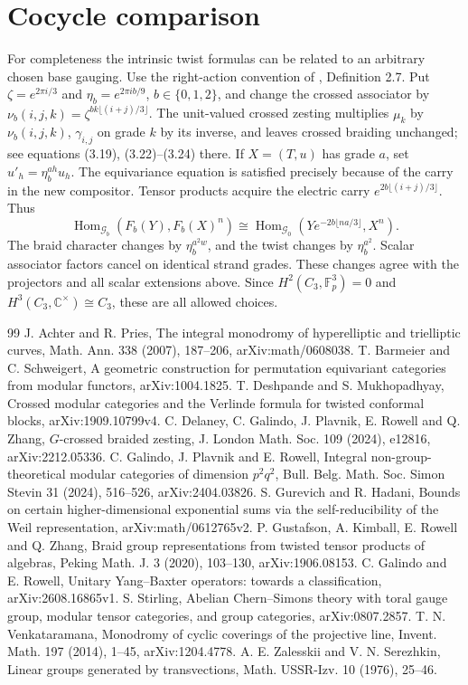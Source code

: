 \documentclass[11pt]{amsart}
\newcommand{\Fp}{\mathbb F_p}
\newcommand{\Hom}{\operatorname{Hom}}
\begin{document}
\section{Cocycle comparison}\label{zesting}
For completeness the intrinsic twist formulas can be related to an
arbitrary chosen base gauging. Use the right-action convention of
\cite{DGP RZ}, Definition 2.7. Put $\zeta=e^{2\pi i/3}$ and
$\eta_b=e^{2\pi i b/9}$, $b\in\{0,1,2\}$, and change the crossed
associator by
$\nu_b(i,j,k)=\zeta^{bk\lfloor(i+j)/3\rfloor}$.
The unit-valued crossed zesting multiplies $\mu_k$ by $\nu_b(i,j,k)$,
$\gamma_{i,j}$ on grade $k$ by its inverse, and leaves crossed
braiding unchanged; see equations (3.19), (3.22)--(3.24) there.
If $X=(T,u)$ has grade $a$, set $u'_h=\eta_b^{ah}u_h$.
The equivariance equation is satisfied precisely because of the
carry in the new compositor. Tensor products acquire the electric
carry $e^{2b\lfloor(i+j)/3\rfloor}$. Thus
\[
\Hom_{\mathcal G_b}(F_b(Y),F_b(X)^n)
\cong\Hom_{\mathcal G_0}
(Y e^{-2b\lfloor na/3\rfloor},X^n).
\]
The braid character changes by $\eta_b^{a^2w}$, and the twist changes
by $\eta_b^{a^2}$. Scalar associator factors cancel on identical
strand grades. These changes agree with the projectors and all
scalar extensions above. Since $H^2(C_3,\Fp^3)=0$ and
$H^3(C_3,\mathbb C^\times)\cong C_3$, these are all allowed choices.

\begin{thebibliography}{99}
 J. Achter and R. Pries, The integral monodromy of hyperelliptic
and trielliptic curves, Math. Ann. 338 (2007), 187--206, arXiv:math/0608038.
 T. Barmeier and C. Schweigert, A geometric construction for
permutation equivariant categories from modular functors, arXiv:1004.1825.
 T. Deshpande and S. Mukhopadhyay, Crossed modular categories
and the Verlinde formula for twisted conformal blocks, arXiv:1909.10799v4.
 C. Delaney, C. Galindo, J. Plavnik, E. Rowell and Q. Zhang,
$G$-crossed braided zesting, J. London Math. Soc. 109 (2024), e12816,
arXiv:2212.05336.
 C. Galindo, J. Plavnik and E. Rowell, Integral
non-group-theoretical modular categories of dimension $p^2q^2$,
Bull. Belg. Math. Soc. Simon Stevin 31 (2024), 516--526, arXiv:2404.03826.
 S. Gurevich and R. Hadani, Bounds on certain higher-dimensional
exponential sums via the self-reducibility of the Weil representation,
arXiv:math/0612765v2.
 P. Gustafson, A. Kimball, E. Rowell and Q. Zhang,
Braid group representations from twisted tensor products of algebras,
Peking Math. J. 3 (2020), 103--130, arXiv:1906.08153.
 C. Galindo and E. Rowell, Unitary Yang--Baxter operators:
towards a classification, arXiv:2608.16865v1.
 S. Stirling, Abelian Chern--Simons theory with toral
gauge group, modular tensor categories, and group categories,
arXiv:0807.2857.
 T. N. Venkataramana, Monodromy of cyclic coverings of the
projective line, Invent. Math. 197 (2014), 1--45, arXiv:1204.4778.
 A. E. Zalesskii and V. N. Serezhkin, Linear groups generated
by transvections, Math. USSR-Izv. 10 (1976), 25--46.
\end{thebibliography}
\end{document}
